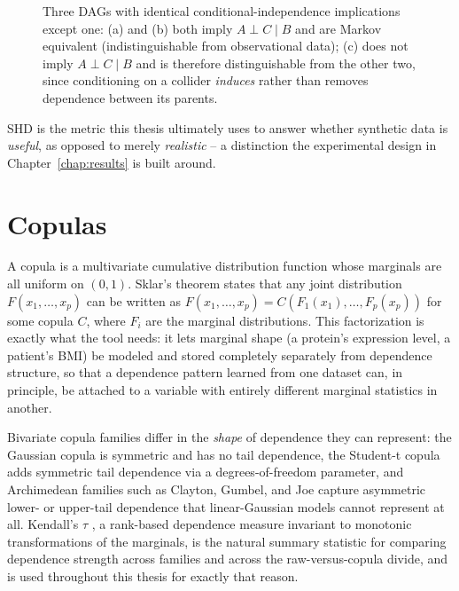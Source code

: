\documentclass[
  english,
  class=report,
  accentcolor=2c,
  marginpar=false,
  parskip=half-,
  fontsize=11pt,
  ruledheaders=false,
  pdfa=false,
  IMRAD=false,
  thesis={type=master}
]{tudapub}
\begin{document}
\begin{figure}[ht]
\centering
{}
\caption{Three DAGs with identical conditional-independence implications
except one: (a) and (b) both imply $A \perp C \mid B$ and are Markov
equivalent (indistinguishable from observational data); (c) does not imply
$A \perp C \mid B$ and is therefore distinguishable from the other two,
since conditioning on a collider \emph{induces} rather than removes
dependence between its parents.}
\label{fig:mec-example}
\end{figure}

SHD is the metric this thesis ultimately uses to answer whether synthetic
data is \emph{useful}, as opposed to merely \emph{realistic} -- a
distinction the experimental design in Chapter~\ref{chap:results} is built
around.

\section{Copulas}
A copula is a multivariate cumulative distribution function whose marginals
are all uniform on $(0,1)$. Sklar's theorem \parencite{sklar1959} states
that any joint distribution $F(x_1,\dots,x_p)$ can be written as
$F(x_1,\dots,x_p) = C(F_1(x_1),\dots,F_p(x_p))$ for some copula $C$, where
$F_i$ are the marginal distributions. This factorization is exactly what the
tool needs: it lets marginal shape (a protein's expression level, a
patient's BMI) be modeled and stored completely separately from dependence
structure, so that a dependence pattern learned from one dataset can, in
principle, be attached to a variable with entirely different marginal
statistics in another.

Bivariate copula families differ in the \emph{shape} of dependence they can
represent: the Gaussian copula is symmetric and has no tail dependence, the
Student-t copula adds symmetric tail dependence via a degrees-of-freedom
parameter, and Archimedean families such as Clayton, Gumbel, and Joe
\parencite{joe1997} capture asymmetric lower- or upper-tail dependence that
linear-Gaussian models cannot represent at all. Kendall's $\tau$
\parencite{kendall1938}, a rank-based dependence measure invariant to
monotonic transformations of the marginals, is the natural summary statistic
for comparing dependence strength across families and across the raw-versus-copula
divide, and is used throughout this thesis for exactly that reason.
\end{document}
